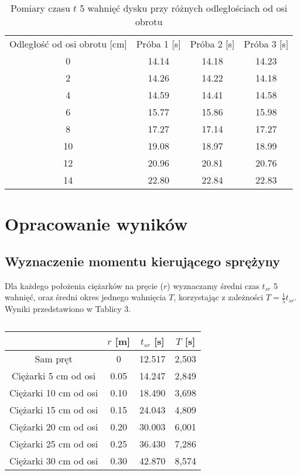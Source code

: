 \documentclass[10pt,a4paper]{article}
\newcommand{\forceindent}{\leavevmode{\parindent=3em\indent}}
\begin{document}
\begin{table}[!h]
\centering
\begin{tabular}{|c||c|c|c|}
\hline
Odległość od osi obrotu [cm]& Próba 1 [s] & Próba 2 [s] & Próba 3 [s] \\
\hhline{|=||=|=|=|}
0 & 14.14 & 14.18 & 14.23 \\ \hline
2 & 14.26 & 14.22 & 14.18 \\ 
4 & 14.59 & 14.41 & 14.58 \\
6 & 15.77 & 15.86 & 15.98 \\
8 & 17.27 & 17.14 & 17.27 \\
10 & 19.08 & 18.97 & 18.99 \\
12 & 20.96 & 20.81 & 20.76 \\
14 & 22.80 & 22.84 & 22.83 \\
\hline

\end{tabular}
\caption{Pomiary czasu $t$ 5 wahnięć dysku przy różnych odległościach od osi obrotu}
\end{table}
\vspace{10pt}
\newpage
\section{Opracowanie wyników}
\subsection{Wyznaczenie momentu kierującego sprężyny}

\forceindent Dla każdego położenia ciężarków na pręcie ($r$) wyznaczamy średni czas $t_{sr}$ 5 wahnięć, oraz średni okres jednego wahnięcia $T$, korzystając z zależności $T = \frac{1}{5}t_{sr}$. Wyniki przedstawiono w Tablicy 3.\\ 
\begin{table}[!h]
\centering
\begin{tabular}{|c||c|c|c|}
\hline

 & $r$ [m] & $t_{sr}$ [s] & $T$ [s] \\
\hline	
\hline
Sam pręt & 0 &12.517 & 2,503 \\ \hline
Ciężarki 5 cm od osi & 0.05 & 14.247 & 2,849\\ \hline
Ciężarki 10 cm od osi&  0.10 & 18.490 & 3,698 \\ \hline
Ciężarki 15 cm od osi&0.15 & 24.043 &4,809 \\ \hline
Ciężarki 20 cm od osi&0.20 & 30.003 &6,001 \\ \hline
Ciężarki 25 cm od osi&0.25 & 36.430 & 7,286 \\ \hline
Ciężarki 30 cm od osi&0.30 &  42.870 & 8,574 \\ \hline


\end{tabular}
\caption{}
\end{table}
\end{document}
